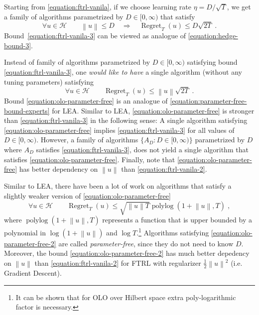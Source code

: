 \documentclass{colt2016} %
\DeclareMathOperator{\Regret}{Regret}
\DeclareMathOperator{\polylog}{polylog}
\renewcommand{\H}{\mathcal{H}}  %
\newcommand{\norm}[1]{\left\|{#1}\right\|}
\begin{document}
Starting from \eqref{equation:ftrl-vanila}, if we choose learning rate $\eta =
D/\sqrt{T}$, we get a family of algorithms parametrized by $D \in [0,\infty)$
that satisfy
\begin{equation}
\label{equation:ftrl-vanila-3}
\forall u \in \H \qquad \norm{u} \le D \quad  \Longrightarrow \quad \Regret_T(u) \le D \sqrt{2T} \; .
\end{equation}
Bound~\eqref{equation:ftrl-vanila-3} can be viewed as analogue of \eqref{equation:hedge-bound-3}.

Instead of family of algorithms parametrized by $D \in [0,\infty)$ satisfying
bound \eqref{equation:ftrl-vanila-3}, one \emph{would like
to have} a single algorithm (without any tuning parameters) satisfying
\begin{equation}
\label{equation:olo-parameter-free}
\forall u \in \H \qquad \Regret_T(u) \le \norm{u} \sqrt{2T} \; .
\end{equation}
Bound \eqref{equation:olo-parameter-free} is an analogue of
\eqref{equation:parameter-free-bound-experts} for LEA. Similar to LEA,
\eqref{equation:olo-parameter-free} is stronger than
\eqref{equation:ftrl-vanila-3} in the following sense: A single algorithm
satisfying \eqref{equation:olo-parameter-free} implies
\eqref{equation:ftrl-vanila-3} for all values of $D \in [0,\infty)$.
However, a family of algorithms $\{A_D : D \in [0,\infty)\}$ parametrized by $D$
where $A_D$ satisfies \eqref{equation:ftrl-vanila-3}, does not yield
a single algorithm that satisfies \eqref{equation:olo-parameter-free}.
Finally, note that \eqref{equation:olo-parameter-free} has better dependency on $\norm{u}$
than \eqref{equation:ftrl-vanila-2}.

Similar to LEA, there have been a lot of work on algorithms
\citep{Streeter-McMahan-2012, Orabona-2013, McMahan-Abernethy-2013,
McMahan-Orabona-2014} that satisfy a slightly weaker version of
\eqref{equation:olo-parameter-free}
\begin{equation}
\label{equation:olo-parameter-free-2}
\forall u \in \H \qquad \Regret_T(u) \le \sqrt{\norm{u} T} \polylog(1 + \norm{u}, T) \; ,
\end{equation}
where $\polylog(1 + \norm{u}, T)$ represents a function that is upper bounded by
a polynomial in $\log(1+\norm{u})$ and $\log T$.\footnote{It can be
shown that for OLO over Hilbert space extra poly-logarithmic factor is necessary.} 
Algorithms satisfying \eqref{equation:olo-parameter-free-2}
are called \emph{parameter-free}, since they do not need to know $D$.
Moreover, the bound \eqref{equation:olo-parameter-free-2} has much better
depedency on $\norm{u}$ than \eqref{equation:ftrl-vanila-2} for
FTRL with regularizer $\frac{1}{2}\norm{u}^2$ (i.e. Gradient Descent).
\end{document}

